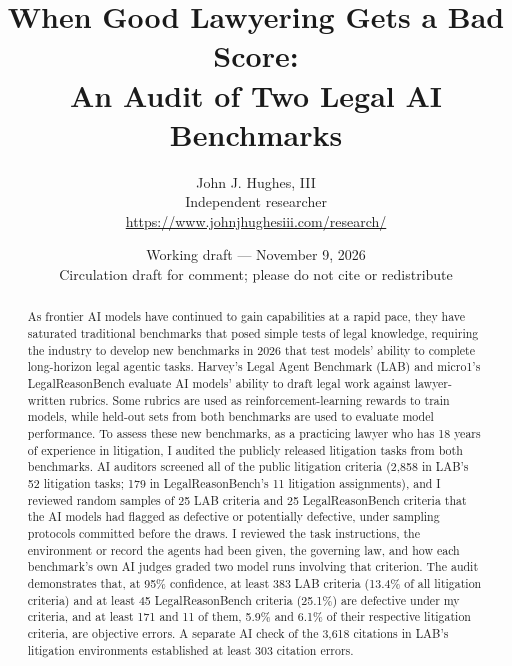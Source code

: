 \documentclass[11pt]{article}
\title{When Good Lawyering Gets a Bad Score:\\An Audit of Two Legal AI Benchmarks}
\author{John J. Hughes, III\\Independent researcher\\\url{https://www.johnjhughesiii.com/research/}}
\date{Working draft --- November 9, 2026\\[0.3em]{\normalsize Circulation draft for comment; please do not cite or redistribute}}
\newcommand{\labTasks}{52}
\newcommand{\labCriteria}{2{,}858}
\newcommand{\labSample}{25}
\newcommand{\labDefectiveLB}{383}
\newcommand{\labDefectiveShare}{13.4}
\newcommand{\labObjectiveLB}{171}
\newcommand{\labObjectiveShare}{5.9}
\newcommand{\lrbAssignments}{11}
\newcommand{\lrbCriteria}{179}
\newcommand{\lrbSample}{25}
\newcommand{\lrbDefectiveLB}{45}
\newcommand{\lrbDefectiveShareLB}{25.1}
\newcommand{\lrbObjectiveLB}{11}
\newcommand{\lrbObjectiveShareLB}{6.1}
\newcommand{\labCitationsChecked}{3{,}618}
\newcommand{\labCitationErrorsLB}{303}
\begin{document}
\maketitle
\begin{center}\small{}\end{center}
\begin{abstract}
As frontier AI models have continued to gain capabilities at a rapid pace, they have saturated traditional benchmarks that posed simple tests of legal knowledge, requiring the industry to develop new benchmarks in 2026 that test models' ability to complete long-horizon legal agentic tasks. Harvey's Legal Agent Benchmark (LAB) and micro1's LegalReasonBench evaluate AI models' ability to draft legal work against lawyer-written rubrics. Some rubrics are used as reinforcement-learning rewards to train models, while held-out sets from both benchmarks are used to evaluate model performance. To assess these new benchmarks, as a practicing lawyer who has 18 years of experience in litigation, I audited the publicly released litigation tasks from both benchmarks. AI auditors screened all of the public litigation criteria (\labCriteria{} in LAB's \labTasks{} litigation tasks; \lrbCriteria{} in LegalReasonBench's \lrbAssignments{} litigation assignments), and I reviewed random samples of \labSample{} LAB criteria and \lrbSample{} LegalReasonBench criteria that the AI models had flagged as defective or potentially defective, under sampling protocols committed before the draws. I reviewed the task instructions, the environment or record the agents had been given, the governing law, and how each benchmark's own AI judges graded two model runs involving that criterion. The audit demonstrates that, at 95\% confidence, at least \labDefectiveLB{} LAB criteria (\labDefectiveShare\% of all litigation criteria) and at least \lrbDefectiveLB{} LegalReasonBench criteria (\lrbDefectiveShareLB\%) are defective under my criteria, and at least \labObjectiveLB{} and \lrbObjectiveLB{} of them, \labObjectiveShare\% and \lrbObjectiveShareLB\% of their respective litigation criteria, are objective errors. A separate AI check of the \labCitationsChecked{} citations in LAB's litigation environments established at least \labCitationErrorsLB{} citation errors.


\end{abstract}
\end{document}
